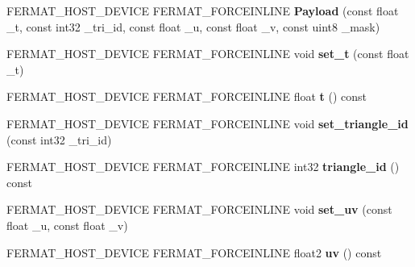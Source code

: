 \begin{DoxyCompactItemize}
\item 
\mbox{\label{struct_payload_ad07fb17beb88596c71fe9bd7f7d58467}} 
F\+E\+R\+M\+A\+T\+\_\+\+H\+O\+S\+T\+\_\+\+D\+E\+V\+I\+CE F\+E\+R\+M\+A\+T\+\_\+\+F\+O\+R\+C\+E\+I\+N\+L\+I\+NE {\bfseries Payload} (const float \+\_\+t, const int32 \+\_\+tri\+\_\+id, const float \+\_\+u, const float \+\_\+v, const uint8 \+\_\+mask)
\item 
\mbox{\label{struct_payload_a07cd17390929fc617782a100bdb3bd2f}} 
F\+E\+R\+M\+A\+T\+\_\+\+H\+O\+S\+T\+\_\+\+D\+E\+V\+I\+CE F\+E\+R\+M\+A\+T\+\_\+\+F\+O\+R\+C\+E\+I\+N\+L\+I\+NE void {\bfseries set\+\_\+t} (const float \+\_\+t)
\item 
\mbox{\label{struct_payload_a07678f3a6d9245dd4e295f995efe1e47}} 
F\+E\+R\+M\+A\+T\+\_\+\+H\+O\+S\+T\+\_\+\+D\+E\+V\+I\+CE F\+E\+R\+M\+A\+T\+\_\+\+F\+O\+R\+C\+E\+I\+N\+L\+I\+NE float {\bfseries t} () const
\item 
\mbox{\label{struct_payload_a711c546f39e4c8506b1263d5696def3f}} 
F\+E\+R\+M\+A\+T\+\_\+\+H\+O\+S\+T\+\_\+\+D\+E\+V\+I\+CE F\+E\+R\+M\+A\+T\+\_\+\+F\+O\+R\+C\+E\+I\+N\+L\+I\+NE void {\bfseries set\+\_\+triangle\+\_\+id} (const int32 \+\_\+tri\+\_\+id)
\item 
\mbox{\label{struct_payload_af0ca91daae0597abaec946af6ae79f89}} 
F\+E\+R\+M\+A\+T\+\_\+\+H\+O\+S\+T\+\_\+\+D\+E\+V\+I\+CE F\+E\+R\+M\+A\+T\+\_\+\+F\+O\+R\+C\+E\+I\+N\+L\+I\+NE int32 {\bfseries triangle\+\_\+id} () const
\item 
\mbox{\label{struct_payload_a4968211934ac6e65ed15aa6949f896cb}} 
F\+E\+R\+M\+A\+T\+\_\+\+H\+O\+S\+T\+\_\+\+D\+E\+V\+I\+CE F\+E\+R\+M\+A\+T\+\_\+\+F\+O\+R\+C\+E\+I\+N\+L\+I\+NE void {\bfseries set\+\_\+uv} (const float \+\_\+u, const float \+\_\+v)
\item 
\mbox{\label{struct_payload_a91bf009413dd02b88a1be5a912d6dbfb}} 
F\+E\+R\+M\+A\+T\+\_\+\+H\+O\+S\+T\+\_\+\+D\+E\+V\+I\+CE F\+E\+R\+M\+A\+T\+\_\+\+F\+O\+R\+C\+E\+I\+N\+L\+I\+NE float2 {\bfseries uv} () const
\item 
\mbox{\label{struct_payload_aee4469a992bbb175716fa5dbdfd60a5a}} 

\end{DoxyCompactItemize}
